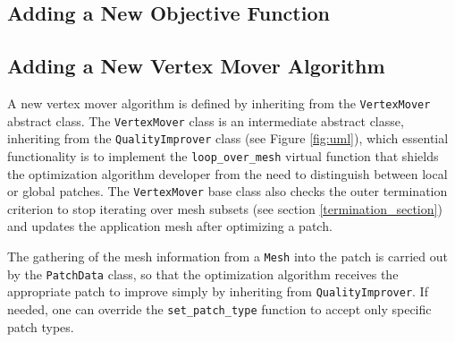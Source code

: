 \subsection{Adding a New Objective Function}

\subsection{Adding a New Vertex Mover Algorithm}

A new vertex mover algorithm is defined by inheriting from the
\texttt{VertexMover} abstract class. The \texttt{VertexMover} class 
is an intermediate abstract classe, inheriting from the
\texttt{QualityImprover} class (see Figure \ref{fig:uml}),  which
essential functionality is to implement the \texttt{loop\_over\_mesh}
virtual function that shields the optimization algorithm developer
from the need to distinguish between local or global patches.  The
\texttt{VertexMover} base class also checks the outer termination
criterion to stop iterating over mesh subsets (see section
\ref{termination_section}) and updates the application mesh after
optimizing a patch.

The gathering of the mesh information from a \texttt{Mesh} into the patch is
carried out by the \texttt{PatchData} class, so that the
optimization algorithm receives the appropriate patch to improve
simply by inheriting from \texttt{QualityImprover}.  If needed, one can 
override the \texttt{set\_patch\_type} function to accept only specific
patch types.




